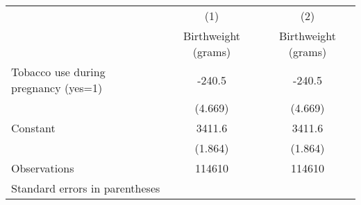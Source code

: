 \begin{tabular}{l*{2}{c}}
\hline\hline
                    &\multicolumn{1}{c}{(1)}&\multicolumn{1}{c}{(2)}\\
                    &\multicolumn{1}{c}{Birthweight (grams)}&\multicolumn{1}{c}{Birthweight (grams)}\\
\hline
Tobacco use during pregnancy (yes=1)&      -240.5&      -240.5\\
                    &     (4.669)&     (4.669)\\
[1em]
Constant            &      3411.6&      3411.6\\
                    &     (1.864)&     (1.864)\\
\hline
Observations        &      114610&      114610\\
\hline\hline
\multicolumn{3}{l}{\footnotesize Standard errors in parentheses}\\
\end{tabular}
